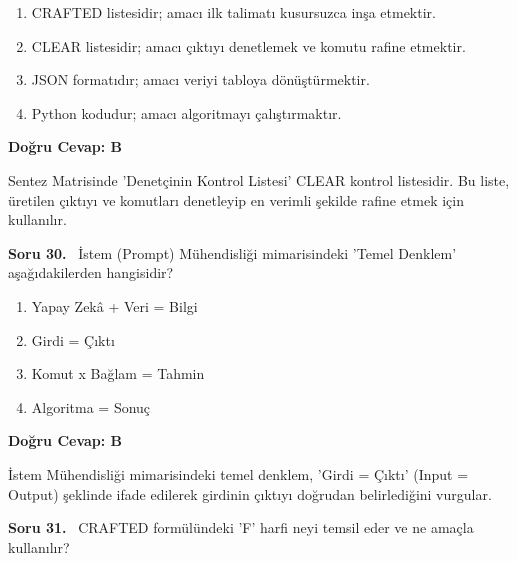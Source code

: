 \documentclass[11pt,a4paper,openany]{book}
\begin{document}
\begin{enumerate}[label=\Alph*), leftmargin=25pt, topsep=4pt, itemsep=2pt]
        \item CRAFTED listesidir; amacı ilk talimatı kusursuzca inşa etmektir.
        \item CLEAR listesidir; amacı çıktıyı denetlemek ve komutu rafine etmektir.
        \item JSON formatıdır; amacı veriyi tabloya dönüştürmektir.
        \item Python kodudur; amacı algoritmayı çalıştırmaktır.
\end{enumerate}

\vspace{4pt}
\begin{tcolorbox}[title=Cevap ve Açıklama, colback=gray!3!white, colframe=primarycolor!90!black, arc=2mm, fonttitle=\bfseries\sffamily, top=6pt, bottom=6pt]
    \textbf{Doğru Cevap: B}

    \vspace{2pt}
    Sentez Matrisinde 'Denetçinin Kontrol Listesi' CLEAR kontrol listesidir. Bu liste, üretilen çıktıyı ve komutları denetleyip en verimli şekilde rafine etmek için kullanılır.
\end{tcolorbox}
\vspace{10pt}
\needspace{5cm}
\vspace{8pt}
\noindent\textbf{\large\sffamily Soru 30.} \ İstem (Prompt) Mühendisliği mimarisindeki 'Temel Denklem' aşağıdakilerden hangisidir?

\begin{enumerate}[label=\Alph*), leftmargin=25pt, topsep=4pt, itemsep=2pt]
        \item Yapay Zekâ + Veri = Bilgi
        \item Girdi = Çıktı
        \item Komut x Bağlam = Tahmin
        \item Algoritma = Sonuç
\end{enumerate}

\vspace{4pt}
\begin{tcolorbox}[title=Cevap ve Açıklama, colback=gray!3!white, colframe=primarycolor!90!black, arc=2mm, fonttitle=\bfseries\sffamily, top=6pt, bottom=6pt]
    \textbf{Doğru Cevap: B}

    \vspace{2pt}
    İstem Mühendisliği mimarisindeki temel denklem, 'Girdi = Çıktı' (Input = Output) şeklinde ifade edilerek girdinin çıktıyı doğrudan belirlediğini vurgular.
\end{tcolorbox}
\vspace{10pt}
\needspace{5cm}
\vspace{8pt}
\noindent\textbf{\large\sffamily Soru 31.} \ CRAFTED formülündeki 'F' harfi neyi temsil eder ve ne amaçla kullanılır?
\end{document}
